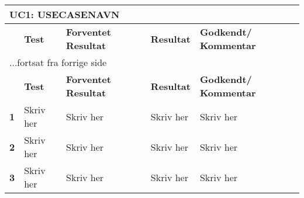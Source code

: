 \begin{center}
	\label{accepttest:uc1} 
\begin{longtable}{|p{}|p{}|p{}|p{}|p{}|} %
\hline
\multicolumn{5}{|l|}{\textbf{UC1: USECASENAVN}} \\ \hline
\multicolumn{1}{|c|}{} &
\textbf{Test} &
\textbf{Forventet \newline Resultat} &
\textbf{Resultat} &
\textbf{Godkendt/ \newline Kommentar} \\ \hline 
\endfirsthead

\multicolumn{5}{l}{...fortsat fra forrige side} \\ \hline 
\multicolumn{1}{|c|}{} &
\textbf{Test} &
\textbf{Forventet \newline Resultat} &
\textbf{Resultat} &
\textbf{Godkendt/ \newline Kommentar} \\ \hline 
\endhead



\textbf{1}	&Skriv her
			&Skriv her
			&Skriv her
			&Skriv her 
			\\\hline

\textbf{2}	&Skriv her
			&Skriv her
			&Skriv her
			&Skriv her 
			\\\hline
			 
\textbf{3}	&Skriv her
			&Skriv her
			&Skriv her
			&Skriv her
			\\\hline

\end{longtable}
\end{center}